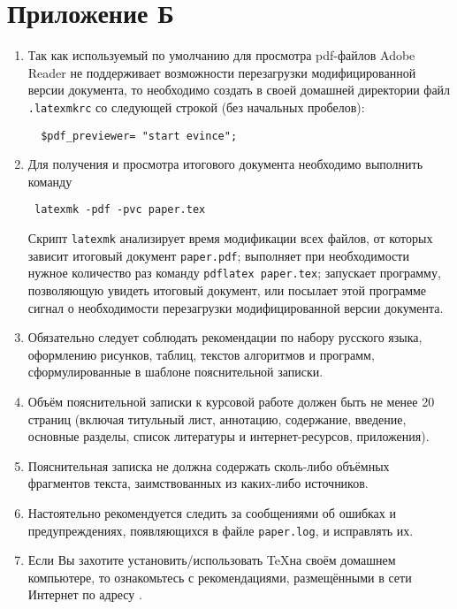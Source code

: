 \section{Приложение Б}

\begin{enumerate}

\item
Так как используемый по умолчанию для просмотра pdf-файлов Adobe Reader не 
поддерживает возможности перезагрузки модифицированной версии документа, то
необходимо создать в своей домашней директории файл \verb|.latexmkrc|
со следующей строкой (без начальных пробелов):

\begin{verbatim}
  $pdf_previewer= "start evince";
\end{verbatim} 

\item
Для получения и просмотра итогового документа необходимо выполнить команду

\begin{verbatim}
 latexmk -pdf -pvc paper.tex
\end{verbatim} 

\noindent
Скрипт \verb|latexmk| анализирует время модификации всех файлов, от которых
зависит итоговый документ \verb|paper.pdf|; выполняет при необходимости
нужное количество раз команду \verb|pdflatex paper.tex|; запускает программу,
позволяющую увидеть итоговый документ, или посылает этой программе
сигнал о необходимости перезагрузки модифицированной версии документа. 

\item
Обязательно следует соблюдать рекомендации по набору русского языка, 
оформлению рисунков, таблиц, текстов алгоритмов и программ, сформулированные
в шаблоне пояснительной записки.

\item
Объём пояснительной записки к курсовой работе должен быть не менее
20 страниц (включая титульный лист, аннотацию, содержание, введение,
основные разделы, список литературы и интернет-ресурсов, приложения).

\item
Пояснительная записка не должна содержать сколь-либо объёмных фрагментов
текста, заимствованных из каких-либо источников. 

\item
Настоятельно рекомендуется следить за сообщениями об ошибках и 
предупреждениях, появляющихся в файле \verb|paper.log|, и исправлять их.

\item
Если Вы захотите установить/использовать \TeX на своём домашнем компьютере,
то ознакомьтесь с рекомендациями, размещёнными в сети Интернет по адресу
.

\end{enumerate}
